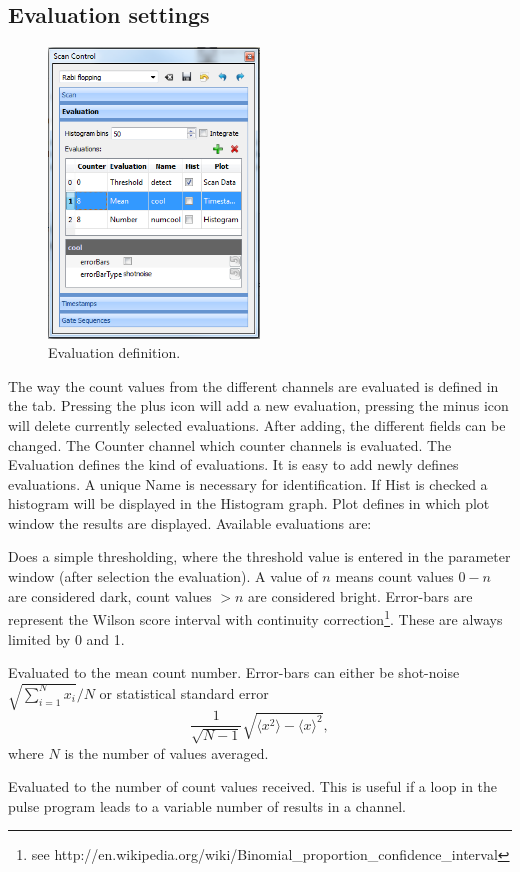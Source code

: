 \documentclass[11pt]{scrartcl}
\begin{document}
\subsection{Evaluation settings}
\begin{figure}
\centering
\includegraphics[width=0.5\textwidth]{ScanParametersEvaluation}
\caption{\label{PulseProgram} Evaluation definition.}
\end{figure}
The way the count values from the different channels are evaluated is defined in the  tab. Pressing the plus icon will add a new evaluation, pressing the minus icon will delete currently selected evaluations. After adding, the different fields can be changed. The Counter channel which counter channels is evaluated. The Evaluation defines the kind of evaluations. It is easy to add newly defines evaluations. A unique Name is necessary for identification. If Hist is checked a histogram will be displayed in the Histogram graph. Plot defines in which plot window the results are displayed. Available evaluations are:
\begin{description}
\item {} Does a simple thresholding, where the threshold value is entered in the parameter window (after selection the evaluation). A value of $n$ means count values $0-n$ are considered dark, count values $>n$ are considered bright. Error-bars are  represent the Wilson score interval with continuity correction\footnote{see http://en.wikipedia.org/wiki/Binomial_proportion_confidence_interval}. These are always limited by 0 and 1.
\item {} Evaluated to the mean count number. Error-bars can either be shot-noise $\sqrt{\sum_{i=1}^N{x_i}}/N$ or statistical standard error $$\frac{1}{\sqrt{N-1}}\sqrt{\langle x^2 \rangle - \langle x \rangle^2},$$ where $N$ is the number of values averaged.
\item {} Evaluated to the number of count values received. This is useful if a loop in the pulse program leads to a variable number of results in a channel.
\end{description}
\end{document}
